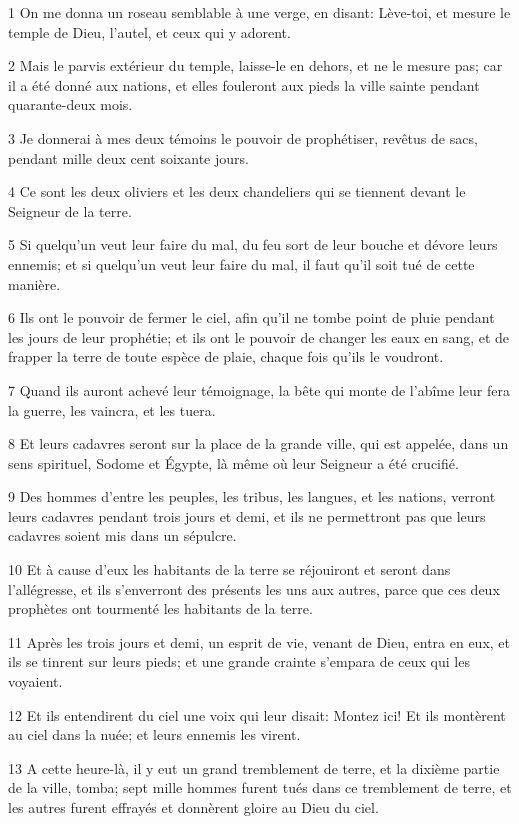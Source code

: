 \par 1 On me donna un roseau semblable à une verge, en disant: Lève-toi, et mesure le temple de Dieu, l'autel, et ceux qui y adorent.
\par 2 Mais le parvis extérieur du temple, laisse-le en dehors, et ne le mesure pas; car il a été donné aux nations, et elles fouleront aux pieds la ville sainte pendant quarante-deux mois.
\par 3 Je donnerai à mes deux témoins le pouvoir de prophétiser, revêtus de sacs, pendant mille deux cent soixante jours.
\par 4 Ce sont les deux oliviers et les deux chandeliers qui se tiennent devant le Seigneur de la terre.
\par 5 Si quelqu'un veut leur faire du mal, du feu sort de leur bouche et dévore leurs ennemis; et si quelqu'un veut leur faire du mal, il faut qu'il soit tué de cette manière.
\par 6 Ils ont le pouvoir de fermer le ciel, afin qu'il ne tombe point de pluie pendant les jours de leur prophétie; et ils ont le pouvoir de changer les eaux en sang, et de frapper la terre de toute espèce de plaie, chaque fois qu'ils le voudront.
\par 7 Quand ils auront achevé leur témoignage, la bête qui monte de l'abîme leur fera la guerre, les vaincra, et les tuera.
\par 8 Et leurs cadavres seront sur la place de la grande ville, qui est appelée, dans un sens spirituel, Sodome et Égypte, là même où leur Seigneur a été crucifié.
\par 9 Des hommes d'entre les peuples, les tribus, les langues, et les nations, verront leurs cadavres pendant trois jours et demi, et ils ne permettront pas que leurs cadavres soient mis dans un sépulcre.
\par 10 Et à cause d'eux les habitants de la terre se réjouiront et seront dans l'allégresse, et ils s'enverront des présents les uns aux autres, parce que ces deux prophètes ont tourmenté les habitants de la terre.
\par 11 Après les trois jours et demi, un esprit de vie, venant de Dieu, entra en eux, et ils se tinrent sur leurs pieds; et une grande crainte s'empara de ceux qui les voyaient.
\par 12 Et ils entendirent du ciel une voix qui leur disait: Montez ici! Et ils montèrent au ciel dans la nuée; et leurs ennemis les virent.
\par 13 A cette heure-là, il y eut un grand tremblement de terre, et la dixième partie de la ville, tomba; sept mille hommes furent tués dans ce tremblement de terre, et les autres furent effrayés et donnèrent gloire au Dieu du ciel.
